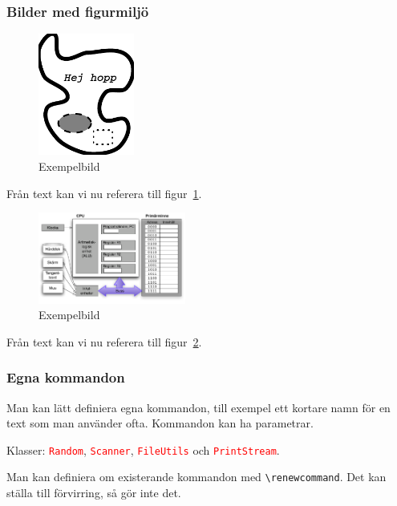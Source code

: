 \begin{frame}[fragile,t]
  \frametitle{Bilder med figurmiljö}
  \vspace{1em}


  \begin{exsrc}
\begin{figure}
  \centering
  \includegraphics[height=40mm]
      {images/bild.pdf}
  \caption{Exempelbild}
  \label{fig:exempelbild}
\end{figure}
Från text kan vi nu referera till figur~\ref{fig:exempelbild}.
  \end{exsrc}
  \begin{exresult}
\begin{figure}
  \centering
  \includegraphics[height=30mm]{images/enkelmodell.pdf}
  \caption{Exempelbild}
  \label{fig:exempelbild2}
\end{figure}
Från text kan vi nu referera till figur~\ref{fig:exempelbild2}.
  \end{exresult}

\end{frame}


\begin{frame}[fragile]
  \frametitle{Egna kommandon}
  Man kan lätt definiera egna kommandon, till exempel ett kortare namn
  för en text som man använder ofta. Kommandon kan ha parametrar.

  \vspace{10mm}

  \begin{exlatex}
\newcommand{\scala}[1]
  {\texttt{\textcolor{red}{#1}}}

Klasser: \scala{Random},
\scala{Scanner}, \scala{FileUtils} och
\scala{PrintStream}.
  \end{exlatex}

  \vspace{10mm}

  Man kan definiera om existerande kommandon med
  \verb+\renewcommand+. Det kan ställa till förvirring, så
  gör inte det.
\end{frame}

